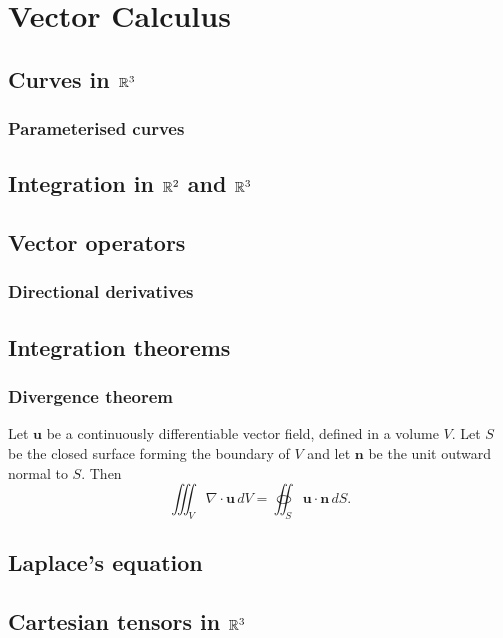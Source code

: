 \documentclass[main.tex]{subfiles}
\begin{document}
	\chapter{Vector Calculus}
		\section{Curves in $\mathbb R^3$}
		\subsection{Parameterised curves}
		
		\section{Integration in $\mathbb R^2$ and $\mathbb R^3$}
		
		\section{Vector operators}
		\subsection{Directional derivatives}
		
		\section{Integration theorems}
		\subsection{Divergence theorem}
		\begin{theorem}
			Let $\mathbf{u}$ be a continuously differentiable vector field, defined in a volume $V$. Let $S$ be the closed surface forming the boundary of $V$ and let $\mathbf{n}$ be the unit outward normal to $S$. Then
			\begin{equation*}
				\iiint_V \nabla \cdot \mathbf{u}\, dV = \oiint_S \mathbf{u}\cdot \mathbf n\, dS.
			\end{equation*}
		\end{theorem}
	
		\section{Laplace's equation}
		
		\section{Cartesian tensors in $\mathbb R^3$}
\end{document}
